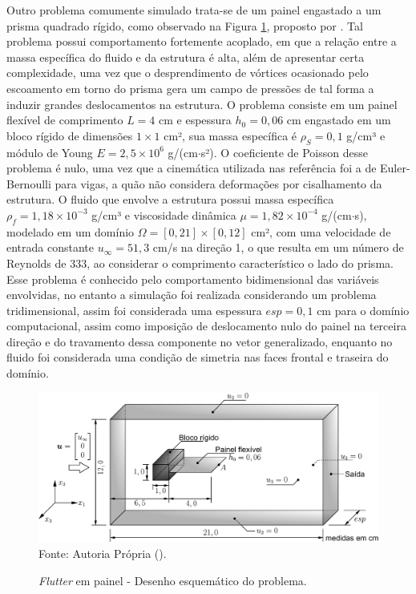 Outro problema comumente simulado trata-se de um painel engastado a um prisma quadrado rígido, como observado na Figura \ref{fig:FSI-prism}, proposto por . Tal problema possui comportamento fortemente acoplado, em que a relação entre a massa específica do fluido e da estrutura é alta, além de apresentar certa complexidade, uma vez que o desprendimento de vórtices ocasionado pelo escoamento em torno do prisma gera um campo de pressões de tal forma a induzir grandes deslocamentos na estrutura. O problema consiste em um painel flexível de comprimento $L=4$ cm e espessura $h_0=0,06$ cm engastado em um bloco rígido de dimensões $1\times 1$ cm², sua massa específica é $\rho_S=0,1$ g/cm³ e módulo de Young $E=2,5\times 10^6$ g/(cm$\cdot$s²). O coeficiente de Poisson desse problema é nulo, uma vez que a cinemática utilizada nas referência foi a de Euler-Bernoulli para vigas, a quão não considera deformações por cisalhamento da estrutura. O fluido que envolve a estrutura possui massa específica $\rho_f=1,18\times10^{-3}$ g/cm³ e viscosidade dinâmica $\mu=1,82\times10^{-4}$ g/(cm$\cdot$s), modelado em um domínio $\Omega=[0,21]\times[0,12]$ cm², com uma velocidade de entrada constante $u_\infty=51,3$ cm/s na direção 1, o que resulta em um número de Reynolds de $333$, ao considerar o comprimento característico o lado do prisma. Esse problema é conhecido pelo comportamento bidimensional das variáveis envolvidas, no entanto a simulação foi realizada considerando um problema tridimensional, assim foi considerada uma espessura $esp=0,1$ cm para o domínio computacional, assim como imposição de deslocamento nulo do painel na terceira direção e do travamento dessa componente no vetor generalizado, enquanto no fluido foi considerada uma condição de simetria nas faces frontal e traseira do domínio.

\begin{figure}[h!]
    \centering
    \caption{\textit{Flutter} em painel - Desenho esquemático do problema.}
    \includegraphics[width=\linewidth]{Figuras/FSI-prism/FSI-prism3D.pdf}
    \\Fonte: Autoria Própria (\the\year).
    \label{fig:FSI-prism}
\end{figure}

